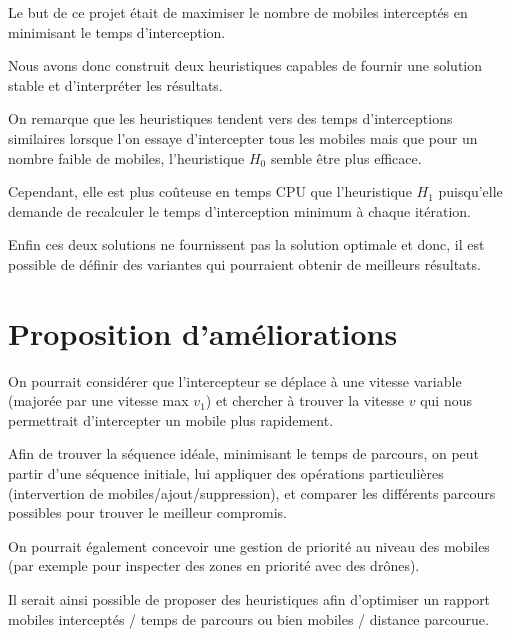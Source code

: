 Le but de ce projet était de maximiser le nombre de mobiles interceptés en minimisant le temps d'interception.

Nous avons donc construit deux heuristiques capables de fournir une solution stable et d'interpréter les résultats.

On remarque que les heuristiques tendent vers des temps d'interceptions similaires lorsque l'on essaye d'intercepter tous les mobiles mais que pour un nombre faible de mobiles, l'heuristique $H_0$ semble être plus efficace.

Cependant, elle est plus coûteuse en temps CPU que l'heuristique $H_1$ puisqu'elle demande de recalculer le temps d'interception minimum à chaque itération.

Enfin ces deux solutions ne fournissent pas la solution optimale et donc, il est possible de définir des variantes qui pourraient obtenir de meilleurs résultats.

\section*{Proposition d'améliorations}

On pourrait considérer que l'intercepteur se déplace à une vitesse variable (majorée par une vitesse max $v_1$) et chercher à trouver la vitesse $v$ qui nous permettrait d'intercepter un mobile plus rapidement.

Afin de trouver la séquence idéale, minimisant le temps de parcours, on peut partir d'une séquence initiale, lui appliquer des opérations particulières (intervertion de mobiles/ajout/suppression), et comparer les différents parcours possibles pour trouver le meilleur compromis.

On pourrait également concevoir une gestion de priorité au niveau des mobiles (par exemple pour inspecter des zones en priorité avec des drônes).

Il serait ainsi possible de proposer des heuristiques afin d'optimiser un rapport mobiles interceptés / temps de parcours ou bien mobiles / distance parcourue.
